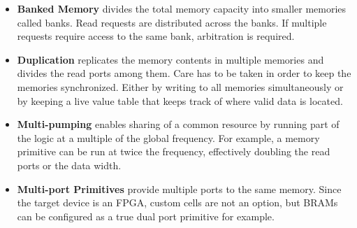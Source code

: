 \begin{itemize}
  \item{\textbf{Banked Memory} divides the total memory capacity into smaller memories called banks. Read requests are distributed across the banks. If multiple requests require access to the same bank, arbitration is required.}
  \item{\textbf{Duplication} replicates the memory contents in multiple memories and divides the read ports among them. Care has to be taken in order to keep the memories synchronized. Either by writing to all memories simultaneously or by keeping a live value table that keeps track of where valid data is located.}
  \item{\textbf{Multi-pumping} enables sharing of a common resource by running part of the logic at a multiple of the global frequency. For example, a memory primitive can be run at twice the frequency, effectively doubling the read ports or the data width.}
  \item{\textbf{Multi-port Primitives} provide multiple ports to the same memory. Since the target device is an FPGA, custom cells are not an option, but BRAMs can be configured as a true dual port primitive for example.}
\end{itemize}






